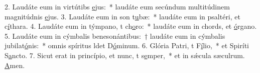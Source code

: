 2. Laudáte eum in virtútibs \uline{e}jus:~* laudáte eum secúndum multitúdinem magnitúdnis \uline{e}jus.
3. Laudáte eum in son t\uline{u}bæ:~* laudáte eum in psaltéri, et c\uline{í}thara.
4. Laudáte eum in týmpano, t ch\uline{o}ro:~* laudáte eum in chords, et \uline{ó}rgano.
5. Laudáte eum in cýmbalis benesonántibus:~† laudáte eum in cýmbalis jubilat\uline{ó}nis:~* omnis spíritus ldet D\uline{ó}minum.
6. Glória Patri, t F\uline{í}lio,~* et Spiríti S\uline{a}ncto.
7. Sicut erat in princípio, et nunc, t s\uline{e}mper,~* et in sǽcula sæculrum. \uline{A}men.
